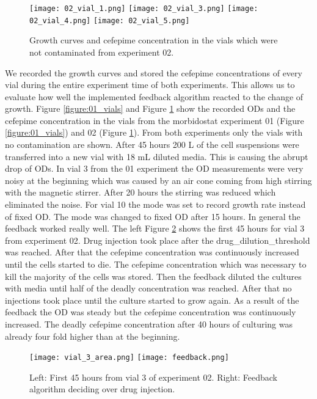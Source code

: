 \begin{figure}	
	\texttt{[image: 02\_vial\_1.png]}
	\texttt{[image: 02\_vial\_3.png]}
	\texttt{[image: 02\_vial\_4.png]}
	\texttt{[image: 02\_vial\_5.png]}	
	\caption{Growth curves and cefepime concentration in the vials which were not contaminated from experiment 02.}
	\label{figure:02_vials}
\end{figure}
We recorded the growth curves and stored the cefepime concentrations of every vial during the entire experiment time of both experiments. This allows us to evaluate how well the implemented feedback algorithm reacted to the change of growth. Figure \ref{figure:01_vials} and Figure \ref{figure:02_vials} show the recorded ODs and the cefepime concentration in the vials from the morbidostat experiment 01 (Figure \ref{figure:01_vials}) and 02 (Figure \ref{figure:02_vials}). From both experiments only the vials with no contamination are shown. After 45 hours 200 \textmu L of the cell suspensions were transferred into a new vial with 18 mL diluted media. This is causing the abrupt drop of ODs. In vial 3 from the 01 experiment the OD measurements were very noisy at the beginning which was caused by an air cone coming from high stirring with the magnetic stirrer. After 20 hours the stirring was reduced which eliminated the noise. For vial 10 the mode was set to record growth rate instead of fixed OD. The mode was changed to fixed OD after 15 hours. 
In general the feedback worked really well. The left Figure \ref{figure:vial_3_area} shows the first 45 hours for vial 3 from experiment 02. Drug injection took place after the drug\_dilution\_threshold was reached. After that the cefepime concentration was continuously increased until the cells started to die. The cefepime concentration which was necessary to kill the majority of the cells was stored. Then the feedback diluted the cultures with media until half of the deadly concentration was reached. After that no injections took place until the culture started to grow again. As a result of the feedback the OD was steady but the cefepime concentration was continuously increased. The deadly cefepime concentration after 40 hours of culturing was already four fold higher than at the beginning. 
\begin{figure}
	\texttt{[image: vial\_3\_area.png]}
	\texttt{[image: feedback.png]}
	\caption{Left: First 45 hours from vial 3 of experiment 02. Right: Feedback algorithm deciding over drug injection.}
	\label{figure:vial_3_area}
\end{figure}
